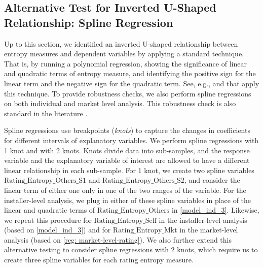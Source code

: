 \documentclass[msom,blindrev]{informs3}
\begin{document}
	
	
	
	\subsection{Alternative Test for Inverted U-Shaped Relationship: Spline Regression}
	
	
	Up to this section, we identified an inverted U-shaped relationship between entropy measures and dependent variables by applying a standard technique. That is, by running a polynomial regression, showing the significance of linear and quadratic terms of entropy measure, and identifying the positive sign for the linear term and the negative sign for the quadratic term. See, e.g., \cite{tan2014does} and \cite{kesavan2014volume} that apply this technique. To provide robustness checks, we also perform spline regressions on both individual and market level analysis. This robustness check is also standard in the literature \citep{kesavan2014volume}.
	
	Spline regressions use breakpoints (\emph{knots}) to capture the changes in coefficients for different intervals of explanatory variables. We perform spline regressions with 1 knot and with 2 knots. Knots divide data into sub-samples, and the response variable and the explanatory variable of interest are allowed to have a different linear relationship in each sub-sample. For 1 knot, we create two spline variables $\text{Rating\_Entropy\_Others\_S1}$ and  $\text{Rating\_Entropy\_Others\_S2}$, and consider the linear term of either one only in one of the two ranges of the variable. For the installer-level analysis, we plug in either of these spline variables in place of the linear and quadratic terms of $\text{Rating\_Entropy\_Others}$ in \eqref{model_ind_3}.  Likewise, we repeat this procedure for $\text{Rating\_Entropy\_Self}$ in the installer-level analysis (based on \eqref{model_ind_3}) and  for $\text{Rating\_Entropy\_Mkt}$ in the market-level analysis (based on \eqref{reg: market-level-rating}). We also further extend this alternative testing to consider spline regressions with 2 knots, which require us to create three spline variables for each rating entropy measure.
	
	
\end{document}
